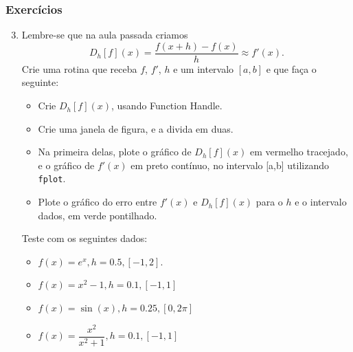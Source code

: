 \documentclass{beamer}
\newcommand{\ssiz}{\scriptsize}
\begin{document}
\begin{frame}
\frametitle{Exerc\'icios}
{\ssiz
\begin{enumerate}
\setcounter{enumi}{2}
 \item Lembre-se que na aula passada criamos
$$D_h[f](x) = \frac{f(x+h)-f(x)}{h} \approx f'(x).$$
Crie uma rotina que receba $f$, $f'$, $h$ e um intervalo $[a,b]$ e que fa\c{c}a o seguinte:
\begin{itemize}\ssiz
 \item Crie $D_h[f](x)$, usando Function Handle.
 \item Crie uma janela de figura, e a divida em duas.
 \item Na primeira delas, plote o gr\'afico de $D_h[f](x)$ em vermelho tracejado, e o gr\'afico de $f'(x)$ em preto cont\'inuo, no intervalo [a,b] utilizando {\tt fplot}.
 \item Plote o gr\'afico do erro entre $f'(x)$ e $D_h[f](x)$ para o $h$ e o intervalo dados, em verde pontilhado.
\end{itemize}
Teste com os seguintes dados:
\begin{itemize}\ssiz
 \item $f(x) = e^x, h = 0.5, [-1,2].$
 \item $f(x) = x^2-1, h = 0.1, [-1,1]$
 \item $f(x) = \sin(x), h = 0.25, [0, 2\pi]$
 \item $f(x) = \dfrac{x^2}{x^2+1}, h =0.1, [-1,1]$
\end{itemize}
\end{enumerate}
}

\end{frame}
\end{document}
